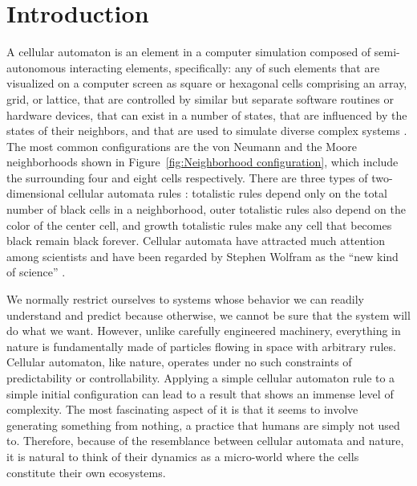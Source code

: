 \documentclass[12pt]{article}
\numberwithin{figure}{section} %
\begin{document}
\newpage
\thispagestyle{plain}
\listoffigures
\newpage
\thispagestyle{plain}
\listoftables
\newpage
\thispagestyle{plain}
\tableofcontents
\thispagestyle{plain}

\pagestyle{fancy}
\fancyhf{}
\rhead{\thepage}
\renewcommand{\headrulewidth}{0.4pt}
\newpage
\section{Introduction}
\label{Introduction}
A cellular automaton is an element in a computer simulation composed of semi-autonomous interacting elements, specifically: any of such elements that are visualized on a computer screen as square or hexagonal cells comprising an array, grid, or lattice, that are controlled by similar but separate software routines or hardware devices, that can exist in a number of states, that are influenced by the states of their neighbors, and that are used to simulate diverse complex systems \cite{MW}. The most common configurations are the von Neumann and the Moore neighborhoods shown in Figure~\ref{fig:Neighborhood configuration}, which include the surrounding four and eight cells respectively. There are three types of two-dimensional cellular automata rules \cite{A new kind of Science}: totalistic rules depend only on the total number of black cells in a neighborhood, outer totalistic rules also depend on the color of the center cell, and growth totalistic rules make any cell that becomes black remain black forever. Cellular automata have attracted much attention among scientists and have been regarded by Stephen Wolfram as the “new kind of science” \cite{A new kind of Science}. 

We normally restrict ourselves to systems whose behavior we can readily understand and predict because otherwise, we cannot be sure that the system will do what we want. However, unlike carefully engineered machinery, everything in nature is fundamentally made of particles flowing in space with arbitrary rules. Cellular automaton, like nature, operates under no such constraints of predictability or controllability. Applying a simple cellular automaton rule to a simple initial configuration can lead to a result that shows an immense level of complexity. The most fascinating aspect of it is that it seems to involve generating something from nothing, a practice that humans are simply not used to. Therefore, because of the resemblance between cellular automata and nature, it is natural to think of their dynamics as a micro-world where the cells constitute their own ecosystems. 
\end{document}
